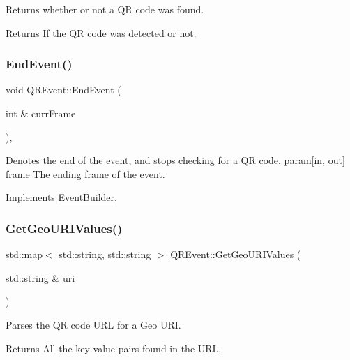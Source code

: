 Returns whether or not a QR code was found. \begin{DoxyReturn}{Returns}
If the QR code was detected or not. 
\end{DoxyReturn}
\mbox{\label{class_q_r_event_adb8483f8513c1f3a5021eef1bd55f8c9}} 
\subsubsection{\texorpdfstring{EndEvent()}{EndEvent()}}
{\footnotesize\ttfamily void Q\+R\+Event\+::\+End\+Event (\begin{DoxyParamCaption}\item[{int \&}]{curr\+Frame }\end{DoxyParamCaption})\hspace{0.3cm}{\ttfamily [override]}, {\ttfamily [virtual]}}

Denotes the end of the event, and stops checking for a QR code. param\mbox{[}in, out\mbox{]} frame The ending frame of the event. 

Implements \mbox{\hyperlink{class_event_builder_ac55f925287ac8aed2d5303706444251e}{Event\+Builder}}.

\mbox{\label{class_q_r_event_a06da538bb4051d2d1c0fb62e7ba3e6a8}} 
\subsubsection{\texorpdfstring{GetGeoURIValues()}{GetGeoURIValues()}}
{\footnotesize\ttfamily std\+::map$<$ std\+::string, std\+::string $>$ Q\+R\+Event\+::\+Get\+Geo\+U\+R\+I\+Values (\begin{DoxyParamCaption}\item[{std\+::string \&}]{uri }\end{DoxyParamCaption})\hspace{0.3cm}{\ttfamily [private]}}

Parses the QR code U\+RL for a Geo U\+RI. \begin{DoxyReturn}{Returns}
All the key-\/value pairs found in the U\+RL. 
\end{DoxyReturn}
\mbox{\label{class_q_r_event_a1b70ce260e6c326d67f95d7999b76519}} 
